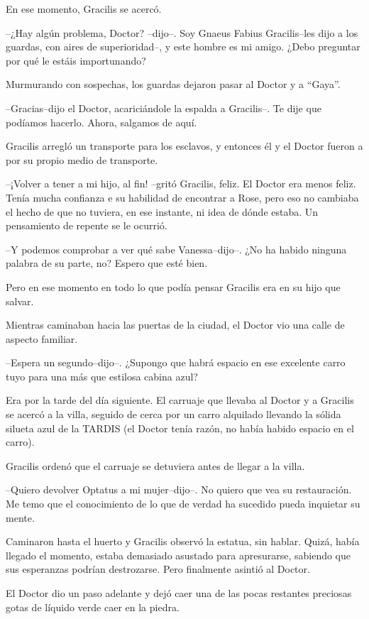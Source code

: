 En ese momento, Gracilis se acercó.

--¿Hay algún problema, Doctor? --dijo--. Soy Gnaeus Fabius Gracilis--les
dijo a los guardas, con aires de superioridad--, y este hombre es mi
amigo. ¿Debo preguntar por qué le estáis importunando?

Murmurando con sospechas, los guardas dejaron pasar al Doctor y a
``Gaya''.

--Gracias--dijo el Doctor, acariciándole la espalda a Gracilis--. Te
dije que podíamos hacerlo. Ahora, salgamos de aquí.

Gracilis arregló un transporte para los esclavos, y entonces él y el
Doctor fueron a por su propio medio de transporte.

--¡Volver a tener a mi hijo, al fin! --gritó Gracilis, feliz. El Doctor
era menos feliz. Tenía mucha confianza e su habilidad de encontrar a
Rose, pero eso no cambiaba el hecho de que no tuviera, en ese instante,
ni idea de dónde estaba. Un pensamiento de repente se le ocurrió.

--Y podemos comprobar a ver qué sabe Vanessa--dijo--. ¿No ha habido
ninguna palabra de su parte, no? Espero que esté bien.

Pero en ese momento en todo lo que podía pensar Gracilis era en su hijo
que salvar.

Mientras caminaban hacia las puertas de la ciudad, el Doctor vio una
calle de aspecto familiar.

--Espera un segundo--dijo--. ¿Supongo que habrá espacio en ese excelente
carro tuyo para una más que estilosa cabina azul?

Era por la tarde del día siguiente. El carruaje que llevaba al Doctor y
a Gracilis se acercó a la villa, seguido de cerca por un carro alquilado
llevando la sólida silueta azul de la TARDIS (el Doctor tenía razón, no
había habido espacio en el carro).

Gracilis ordenó que el carruaje se detuviera antes de llegar a la villa.

--Quiero devolver Optatus a mi mujer--dijo--. No quiero que vea su
restauración. Me temo que el conocimiento de lo que de verdad ha
sucedido pueda inquietar su mente.

Caminaron hasta el huerto y Gracilis observó la estatua, sin hablar.
Quizá, había llegado el momento, estaba demasiado asustado para
apresurarse, sabiendo que sus esperanzas podrían destrozarse. Pero
finalmente asintió al Doctor.

El Doctor dio un paso adelante y dejó caer una de las pocas restantes
preciosas gotas de líquido verde caer en la piedra.

